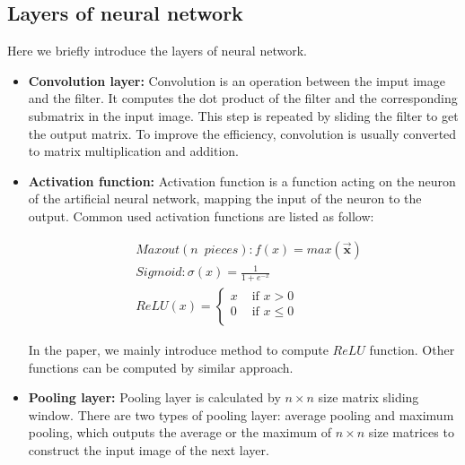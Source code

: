 \documentclass[letterpaper]{article} %
\begin{document}
    \subsection{Layers of neural network}
    Here we briefly introduce the layers of neural network.
    \begin{itemize}
        \item \textbf{Convolution layer:}
        Convolution is an operation between the imput image and the filter.
        It computes the dot product of the filter and the corresponding submatrix in the input image.
        This step is repeated by sliding the filter to get the output matrix.
        To improve the efficiency, convolution is usually converted to matrix multiplication and addition.



        \item \textbf{Activation function:}
        Activation function is a function acting on the neuron of the artificial neural network,
        mapping the input of the neuron to the output.
        Common used activation functions are listed as follow:

        \begin{align*}
        &Maxout (n\enspace pieces): f(x) = max( \overrightarrow{\mathbf{x}})\\
        &Sigmoid: \sigma(x) =\frac{1}{1+e^{-x}}\\
        &ReLU(x)=\begin{cases}
            x & \text{ if } x > 0 \\
            0 & \text{ if } x \leqslant 0 \\
            \end{cases}
        \end{align*}

        In the paper, we mainly introduce method to compute $ReLU$ function.
        Other functions can be computed by similar approach.

        \item \textbf{Pooling layer:}
        Pooling layer is calculated by $n\times n$ size matrix sliding window.
        There are two types of pooling layer: average pooling and maximum pooling,
        which outputs the average or the maximum of $n\times n$ size matrices to construct the input image of the next layer.

    \end{itemize}
\end{document}

